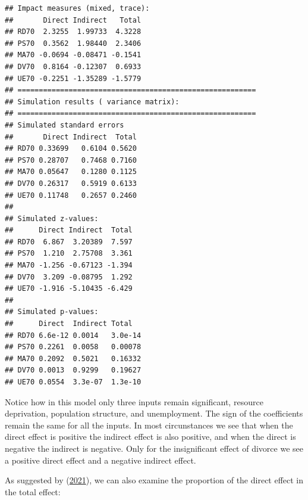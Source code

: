 \documentclass[
  krantz2]{krantz}
\makeatletter
\newenvironment{Shaded}{\begin{snugshade}}{\end{snugshade}}
\newcommand{\NormalTok}[1]{#1}
\newcommand{\OtherTok}[1]{\textcolor[rgb]{0.37,0.37,0.37}{#1}}
\newcommand{\SpecialCharTok}[1]{\textcolor[rgb]{0,0,0}{#1}}
\newenvironment{kframe}{%
\medskip{}
\setlength{\fboxsep}{.8em}
 \def\at@end@of@kframe{}%
 \ifinner\ifhmode%
  \def\at@end@of@kframe{\end{minipage}}%
  \begin{minipage}{\columnwidth}%
 \fi\fi%
 \def\FrameCommand##1{\hskip\@totalleftmargin \hskip-\fboxsep
 \colorbox{shadecolor}{##1}\hskip-\fboxsep
     \hskip-\linewidth \hskip-\@totalleftmargin \hskip\columnwidth}%
 \MakeFramed {\advance\hsize-\width
   \@totalleftmargin\z@ \linewidth\hsize
   \@setminipage}}%
 {\par\unskip\endMakeFramed%
 \at@end@of@kframe}
\renewenvironment{Shaded}{\begin{kframe}}{\end{kframe}}
\makeatother
\begin{document}
\begin{verbatim}
## Impact measures (mixed, trace):
##       Direct Indirect   Total
## RD70  2.3255  1.99733  4.3228
## PS70  0.3562  1.98440  2.3406
## MA70 -0.0694 -0.08471 -0.1541
## DV70  0.8164 -0.12307  0.6933
## UE70 -0.2251 -1.35289 -1.5779
## ========================================================
## Simulation results ( variance matrix):
## ========================================================
## Simulated standard errors
##       Direct Indirect  Total
## RD70 0.33699   0.6104 0.5620
## PS70 0.28707   0.7468 0.7160
## MA70 0.05647   0.1280 0.1125
## DV70 0.26317   0.5919 0.6133
## UE70 0.11748   0.2657 0.2460
## 
## Simulated z-values:
##      Direct Indirect  Total
## RD70  6.867  3.20389  7.597
## PS70  1.210  2.75708  3.361
## MA70 -1.256 -0.67123 -1.394
## DV70  3.209 -0.08795  1.292
## UE70 -1.916 -5.10435 -6.429
## 
## Simulated p-values:
##      Direct  Indirect Total  
## RD70 6.6e-12 0.0014   3.0e-14
## PS70 0.2261  0.0058   0.00078
## MA70 0.2092  0.5021   0.16332
## DV70 0.0013  0.9299   0.19627
## UE70 0.0554  3.3e-07  1.3e-10
\end{verbatim}

Notice how in this model only three inputs remain significant, resource deprivation, population structure, and unemployment. The sign of the coefficients remain the same for all the inputs. In most circunstances we see that when the direct effect is positive the indirect effect is also positive, and when the direct is negative the indirect is negative. Only for the insignificant effect of divorce we see a positive direct effect and a negative indirect effect.

As suggested by (\protect\hyperlink{ref-Kopczewska_2021}{2021}), we can also examine the proportion of the direct effect in the total effect:

\begin{Shaded}
\end{Shaded}
\end{document}
